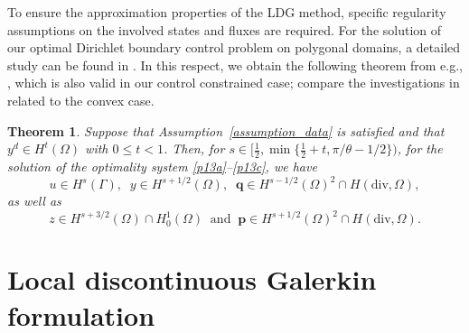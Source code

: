 \documentclass[a4paper,10pt]{article}
\newcommand{\bq}{{\mathbf{q}}}
\newcommand{\bp}{{\mathbf{p}}}
\newtheorem{theorem}{Theorem}[section]
\numberwithin{theorem}{section}
\begin{document}
To ensure the approximation properties of the LDG method, specific regularity assumptions on the involved states and fluxes are required. For the solution of our optimal Dirichlet boundary control problem on polygonal domains, a detailed study can be found in \cite{TApel_MMateos_JPfefferer_ARosch_2015}. In this respect, we obtain the following theorem from e.g., \cite[Theorem~2.10]{WHu_MMateos_JSingler_YZhang_2018}, which is also valid in our control constrained case; compare the investigations in \cite[Section 4]{TApel_MMateos_JPfefferer_ARosch_2015} related to the convex case.
\begin{theorem}\label{thm:higher_reg}
   Suppose that Assumption~\ref{assumption_data} is satisfied  and that $y^d \in H^{t}(\Omega)$ with $0 \leq t < 1$. Then, for $s\in [\frac{1}{2}, \min\{\frac{1}{2}+t,\pi/\theta -1/2\})$, for the solution of the optimality system \eqref{p13a}--\eqref{p13c}, we have 
  \begin{equation*}
     u \in H^s(\Gamma), \;\; y \in H^{s+1/2}(\Omega), \;\;  \bq \in H^{s-1/2}(\Omega)^2\cap H(\mathrm{div},\Omega),\end{equation*}
as well as
\begin{equation*}
z\in H^{s+3/2}(\Omega)\cap H^1_0(\Omega) \;\; \text{and} \;\; \bp\in H^{s+1/2}(\Omega)^2\cap H(\mathrm{div},\Omega).
  \end{equation*}  
\end{theorem}



\section{Local discontinuous Galerkin formulation}\label{sec:ldg}
\end{document}
